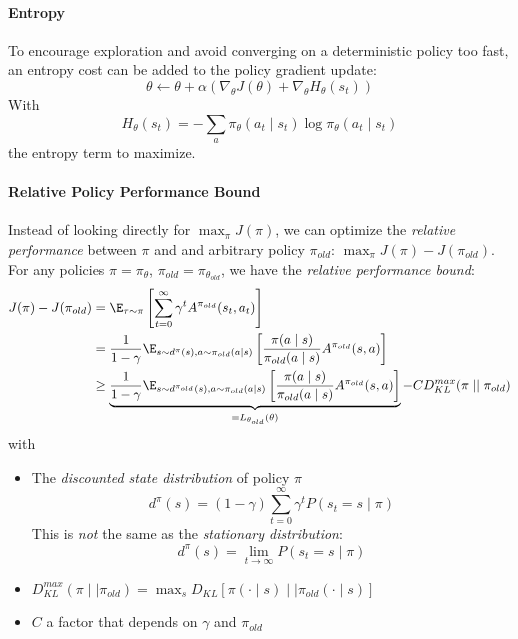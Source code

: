 \paragraph{Entropy}
To encourage exploration and avoid converging on a deterministic policy too fast, an entropy cost can be added to the policy gradient update: 
\[
    \theta \leftarrow \theta + \alpha (\nabla_\theta J(\theta) + \nabla_\theta H_\theta(s_t))
\]
With
\[
    H_\theta(s_t) = - \sum_a \pi_\theta(a_t\mid s_t) \log \pi_\theta(a_t\mid s_t)
\]
the entropy term to maximize.

\paragraph{Relative Policy Performance Bound}
Instead of looking directly for $\max_\pi J(\pi)$, we can optimize the \emph{relative performance} between $\pi$ and and arbitrary policy $\pi_{old}$: $\max_\pi J(\pi) - J(\pi_{old})$. For any policies $\pi = \pi_\theta$, $\pi_{old} = \pi_{\theta_{old}}$, we have the \emph{relative performance bound}:
\begin{align}
    J(\pi) - J(\pi_{old}) 
    &= \E_{\tau \sim \pi} \left[ \sum_{t=0}^\infty \gamma^t A^{\pi_{old}}(s_t,a_t) \right] \nonumber\\
    &= \frac{1}{1-\gamma} \E_{s\sim d^\pi(s), a \sim \pi_{old}(a\mid s)} \left[ \frac{\pi(a\mid s)}{\pi_{old}(a\mid s)} A^{\pi_{old}}(s,a)\right] \nonumber\\
    &\geq \underbrace{\frac{1}{1-\gamma} \E_{s\sim d^{\pi_{old}}(s), a \sim \pi_{old}(a\mid s)} \left[ 
        \frac{\pi(a\mid s)}{\pi_{old}(a\mid s)} A^{\pi_{old}}(s,a)
    \right]}_{=L_{\theta_{old}}(\theta)} - C D_{KL}^{max}(\pi \mid \mid  \pi_{old})
    \label{eq:performance-bound}
\end{align}
with
\begin{itemize}
    \item The \emph{discounted state distribution} of policy $\pi$
    \begin{equation}
        d^\pi(s) = (1-\gamma) \sum_{t=0}^\infty \gamma^t P(s_{t}=s\mid \pi)
    \label{eq:stationary-state-distribution}
    \end{equation}
    This is \emph{not} the same as the \emph{stationary distribution}:
    \[
        d^\pi(s) = \lim_{t\rightarrow \infty} P(s_t = s \mid \pi)
    \]
    \item $D_{KL}^{max}(\pi \mid \mid  \pi_{old}) = \max_s D_{KL}[\pi(\cdot\mid s) \mid \mid  \pi_{old}(\cdot\mid s)]$
    \item $C$ a factor that depends on $\gamma$ and $\pi_{old}$
\end{itemize}
